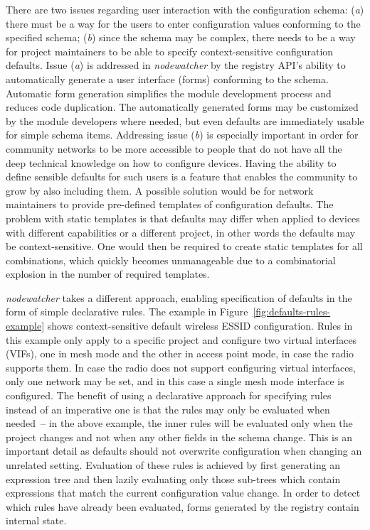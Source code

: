 \documentclass[5p,sort&compress]{elsarticle}
\newcommand{\nodewatcher}{\textit{nodewatcher}}
\begin{document}
There are two issues regarding user interaction with the configuration schema:
(\textit{a}) there must be a way for the users to enter configuration values conforming to the specified schema;
(\textit{b}) since the schema may be complex, there needs to be a way for project maintainers to be able to specify context-sensitive configuration defaults.
Issue (\textit{a}) is addressed in \nodewatcher{} by the registry API's ability to automatically generate a user interface (forms) conforming to the schema.
Automatic form generation simplifies the module development process and reduces code duplication.
The automatically generated forms may be customized by the module developers where needed, but even defaults are immediately usable for simple schema items.
Addressing issue (\textit{b}) is especially important in order for community networks to be more accessible to people that do not have all the deep technical knowledge on how to configure devices.
Having the ability to define sensible defaults for such users is a feature that enables the community to grow by also including them.
A possible solution would be for network maintainers to provide pre-defined templates of configuration defaults.
The problem with static templates is that defaults may differ when applied to devices with different capabilities or a different project, in other words the defaults may be context-sensitive.
One would then be required to create static templates for all combinations, which quickly becomes unmanageable due to a combinatorial explosion in the number of required templates.

\nodewatcher{} takes a different approach, enabling specification of defaults in the form of simple declarative rules.
The example in Figure~\ref{fig:defaults-rules-example} shows context-sensitive default wireless ESSID configuration.
Rules in this example only apply to a specific project and configure two virtual interfaces (VIFs), one in mesh mode and the other in access point mode, in case the radio supports them.
In case the radio does not support configuring virtual interfaces, only one network may be set, and in this case a single mesh mode interface is configured.
The benefit of using a declarative approach for specifying rules instead of an imperative one is that the rules may only be evaluated when needed~-- in the above example, the inner rules will be evaluated only when the project changes and not when any other fields in the schema change.
This is an important detail as defaults should not overwrite configuration when changing an unrelated setting.
Evaluation of these rules is achieved by first generating an expression tree and then lazily evaluating only those sub-trees which contain expressions that match the current configuration value change.
In order to detect which rules have already been evaluated, forms generated by the registry contain internal state.
\end{document}
